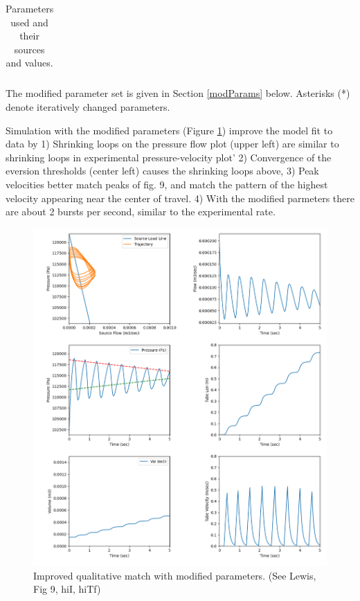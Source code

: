 \documentclass[letterpaper]{article}
\begin{document}
\begin{table}
\begin{tabular}{l|l|l|l|l|l}
\end{tabular}
\caption{Parameters used and their sources and values. }
\end{table}\label{Tab:paramClass}

\vspace{0.175in}

The modified parameter set is given in Section \ref{modParams} below.  Asterisks (*) denote iteratively changed parameters.

Simulation with the modified parameters (Figure \ref{Fig:ModifParResults}) improve the model fit to data by
    1) Shrinking loops on the pressure flow plot (upper left) are similar
  to shrinking loops in experimental pressure-velocity plot'
    2) Convergence of the eversion thresholds (center left) causes the shrinking loops above,
    3) Peak velocities better match peaks of fig. 9, and match the pattern of the highest velocity
  appearing near the center of travel.
    4) With the modified parmeters there are about 2 bursts per second, similar to the experimental rate.



\begin{figure}\centering
\includegraphics[width=.75\textwidth]{Figure_9HhiI_hiTf_tweakedParams.png}
\caption{Improved qualitative match with modified parameters.  (See Lewis, Fig 9, hiI, hiTf)}
\label{Fig:ModifParResults}
\end{figure}
\end{document}
